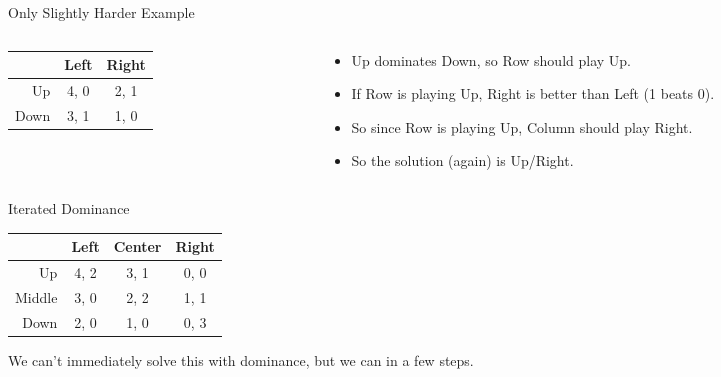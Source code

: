 \documentclass[
  14pt,
  letterpaper,
  ignorenonframetext,
  aspectratio=169,
]{beamer}
\providecommand{\tightlist}{%
  \setlength{\itemsep}{0pt}\setlength{\parskip}{0pt}}\usepackage{longtable,booktabs,array}
\let\olditem\item
\renewcommand{\item}{%
\olditem\vspace{6pt}}
\begin{document}
\begin{frame}{Only Slightly Harder Example}
\protect\hypertarget{only-slightly-harder-example-1}{}
\begin{columns}[T]
\begin{column}{0.4\textwidth}
\begin{table}[!h]
\centering
\begin{tabular}[t]{>{}r|cc}
\toprule
 & Left & Right\\
\midrule
Up & 4, 0 & 2, 1\\
Down & 3, 1 & 1, 0\\
\bottomrule
\end{tabular}
\end{table}
\end{column}

\begin{column}{0.6\textwidth}
\begin{itemize}[<+->]
\tightlist
\item
  Up dominates Down, so Row should play Up.
\item
  If Row is playing Up, Right is better than Left (1 beats 0).
\item
  So since Row is playing Up, Column should play Right.
\item
  So the solution (again) is Up/Right.
\end{itemize}
\end{column}
\end{columns}
\end{frame}

\begin{frame}{Iterated Dominance}
\protect\hypertarget{iterated-dominance}{}
\begin{table}[!h]
\centering
\begin{tabular}[t]{>{}r|ccc}
\toprule
 & Left & Center & Right\\
\midrule
Up & 4, 2 & 3, 1 & 0, 0\\
Middle & 3, 0 & 2, 2 & 1, 1\\
Down & 2, 0 & 1, 0 & 0, 3\\
\bottomrule
\end{tabular}
\end{table}

We can't immediately solve this with dominance, but we can in a few
steps.
\end{frame}
\end{document}
